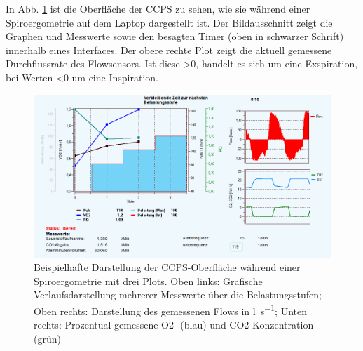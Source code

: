 In Abb. \ref{pic:pic12} ist die Oberfläche der \acs{CCPS} zu sehen, wie sie während einer Spiroergometrie auf dem Laptop dargestellt ist. Der Bildausschnitt zeigt die Graphen und Messwerte sowie den besagten Timer (oben in schwarzer Schrift) innerhalb eines Interfaces. Der obere rechte Plot zeigt die aktuell gemessene Durchflussrate des Flowsensors. Ist diese >0, handelt es sich um eine Exspiration, bei Werten <0 um eine Inspiration.
%
\begin{figure}[H]
	\centering
	\includegraphics[width=\textwidth]{Bilder/sw_screen.png}
	\caption[Beispielhafte Software-Oberfläche während einer Spiroergometrie]{Beispielhafte Darstellung der \acs{CCPS}-Oberfläche während einer Spiroergometrie mit drei Plots. Oben links: Grafische Verlaufsdarstellung mehrerer Messwerte über die Belastungsstufen; Oben rechts: Darstellung des gemessenen Flows in \si{\litre\per\second}; Unten rechts: Prozentual gemessene \acs{O2}- (blau) und \acs{CO2}-Konzentration (grün)}
	\label{pic:pic12}
\end{figure}
%
